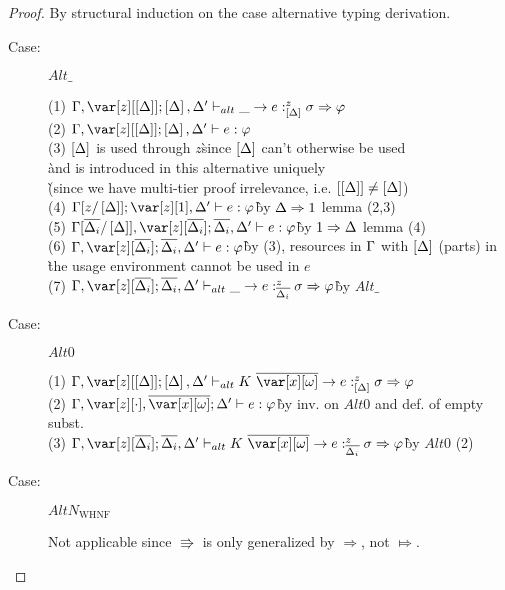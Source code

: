 
\irrelevancelemma*

\begin{proof}
By structural induction on the case alternative typing derivation.

\begin{description}

\item[Case:] $Alt\_$
\begin{tabbing}
    (1) $\G,\z[\irr{\D}];\irr{\D}, \D' \vdash_{alt} \_ \to e :^z_{\irr{\D}} \s \Rightarrow \vp$\\
    (2) $\G, \z[\irr{\D}];\irr{\D},\D' \vdash e : \vp$\\
    (3) $\left[\Delta\right]$ is used through $z$\`since $\left[\Delta\right]$ can't otherwise be used\\\`and is introduced in this alternative uniquely \\\`(since we have multi-tier proof irrelevance, i.e. $\left[\left[\Delta\right]\right]\neq\left[\Delta\right]$)\\
    (4) $\G[z/\irr{\D}]; \z[1], \D' \vdash e : \vp$\` by $\Delta \Rightarrow 1$ lemma (2,3)\\
    (5) $\G[\ov{\D_i}/\irr{\D}], \z[\ov{\D_i}]; \ov{\D_i}, \D' \vdash e : \vp$\` by $1 \Rightarrow \Delta$ lemma (4)\\
    (6) $\G, \z[\ov{\D_i}]; \ov{\D_i}, \D' \vdash e : \vp$\` by (3), resources in $\Gamma$ with $\left[\Delta\right]$ (parts) in\\\` the usage environment cannot be used in $e$\\
    (7) $\G, \z[\ov{\D_i}]; \ov{\D_i}, \D' \vdash_{alt} \_ \to e :^z_{\ov{\D_i}} \s \Rightarrow \vp$\` by $Alt\_$\\
\end{tabbing}

\item[Case:] $Alt0$
\begin{tabbing}
    (1) $\G, \z[\irr{\D}]; \irr{\D}, \D' \vdash_{alt} K~\ov{\xo}\to e :^z_{\irr{\D}} \s \Rightarrow \vp$\\
    (2) $\G, \z[\cdot], \ov{\xo}; \D' \vdash e : \vp$\` by inv. on $Alt0$ and def. of empty subst.\\
    (3) $\G, \z[\ov{\D_i}]; \ov{\D_i}, \D' \vdash_{alt} K~\ov{\xo}\to e :^z_{\ov{\D_i}} \s \Rightarrow \vp$\` by $Alt0$ (2)\\
\end{tabbing}

\item[Case:] $AltN_{\textrm{WHNF}}$
\begin{tabbing}
    Not applicable since $\Rrightarrow$ is only generalized by $\Rightarrow$, not $\Mapsto$.
\end{tabbing}


\end{description}
\end{proof}
